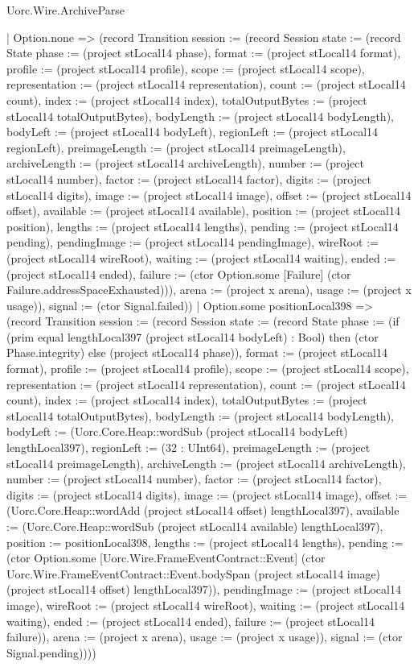 \begin{lexlean}{Uorc.Wire.ArchiveParse}
\begin{semanticmodule}
{          | Option.none => (record Transition {session := (record Session {state := (record State {phase := (project stLocal14 phase), format := (project stLocal14 format), profile := (project stLocal14 profile), scope := (project stLocal14 scope), representation := (project stLocal14 representation), count := (project stLocal14 count), index := (project stLocal14 index), totalOutputBytes := (project stLocal14 totalOutputBytes), bodyLength := (project stLocal14 bodyLength), bodyLeft := (project stLocal14 bodyLeft), regionLeft := (project stLocal14 regionLeft), preimageLength := (project stLocal14 preimageLength), archiveLength := (project stLocal14 archiveLength), number := (project stLocal14 number), factor := (project stLocal14 factor), digits := (project stLocal14 digits), image := (project stLocal14 image), offset := (project stLocal14 offset), available := (project stLocal14 available), position := (project stLocal14 position), lengths := (project stLocal14 lengths), pending := (project stLocal14 pending), pendingImage := (project stLocal14 pendingImage), wireRoot := (project stLocal14 wireRoot), waiting := (project stLocal14 waiting), ended := (project stLocal14 ended), failure := (ctor Option.some [Failure] (ctor Failure.addressSpaceExhausted))}), arena := (project x arena), usage := (project x usage)}), signal := (ctor Signal.failed)})
          | Option.some positionLocal398 => (record Transition {session := (record Session {state := (record State {phase := (if (prim equal lengthLocal397 (project stLocal14 bodyLeft) : Bool) then (ctor Phase.integrity) else (project stLocal14 phase)), format := (project stLocal14 format), profile := (project stLocal14 profile), scope := (project stLocal14 scope), representation := (project stLocal14 representation), count := (project stLocal14 count), index := (project stLocal14 index), totalOutputBytes := (project stLocal14 totalOutputBytes), bodyLength := (project stLocal14 bodyLength), bodyLeft := (Uorc.Core.Heap::wordSub (project stLocal14 bodyLeft) lengthLocal397), regionLeft := (32 : UInt64), preimageLength := (project stLocal14 preimageLength), archiveLength := (project stLocal14 archiveLength), number := (project stLocal14 number), factor := (project stLocal14 factor), digits := (project stLocal14 digits), image := (project stLocal14 image), offset := (Uorc.Core.Heap::wordAdd (project stLocal14 offset) lengthLocal397), available := (Uorc.Core.Heap::wordSub (project stLocal14 available) lengthLocal397), position := positionLocal398, lengths := (project stLocal14 lengths), pending := (ctor Option.some [Uorc.Wire.FrameEventContract::Event] (ctor Uorc.Wire.FrameEventContract::Event.bodySpan (project stLocal14 image) (project stLocal14 offset) lengthLocal397)), pendingImage := (project stLocal14 image), wireRoot := (project stLocal14 wireRoot), waiting := (project stLocal14 waiting), ended := (project stLocal14 ended), failure := (project stLocal14 failure)}), arena := (project x arena), usage := (project x usage)}), signal := (ctor Signal.pending)})))
}
\end{semanticmodule}
\end{lexlean}
